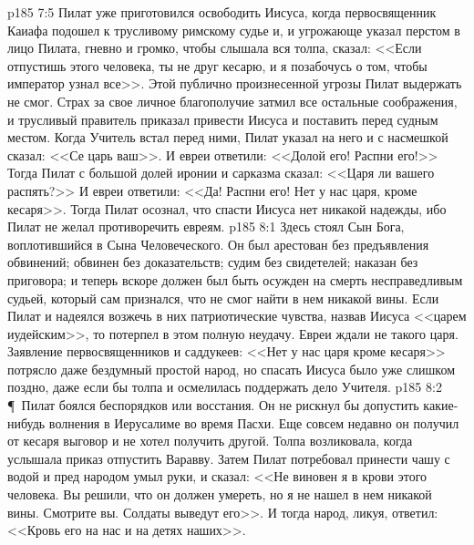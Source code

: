 \vs p185 7:5 Пилат уже приготовился освободить Иисуса, когда первосвященник Каиафа подошел к трусливому римскому судье и, и угрожающе указал перстом в лицо Пилата, гневно и громко, чтобы слышала вся толпа, сказал: <<Если отпустишь этого человека, ты не друг кесарю, и я позабочусь о том, чтобы император узнал все>>. Этой публично произнесенной угрозы Пилат выдержать не смог. Страх за свое личное благополучие затмил все остальные соображения, и трусливый правитель приказал привести Иисуса и поставить перед судным местом. Когда Учитель встал перед ними, Пилат указал на него и с насмешкой сказал: <<Се царь ваш>>. И евреи ответили: <<Долой его! Распни его!>> Тогда Пилат с большой долей иронии и сарказма сказал: <<Царя ли вашего распять?>> И евреи ответили: <<Да! Распни его! Нет у нас царя, кроме кесаря>>. Тогда Пилат осознал, что спасти Иисуса нет никакой надежды, ибо Пилат не желал противоречить евреям.
\vs p185 8:1 Здесь стоял Сын Бога, воплотившийся в Сына Человеческого. Он был арестован без предъявления обвинений; обвинен без доказательств; судим без свидетелей; наказан без приговора; и теперь вскоре должен был быть осужден на смерть несправедливым судьей, который сам признался, что не смог найти в нем никакой вины. Если Пилат и надеялся возжечь в них патриотические чувства, назвав Иисуса <<царем иудейским>>, то потерпел в этом полную неудачу. Евреи ждали не такого царя. Заявление первосвященников и саддукеев: <<Нет у нас царя кроме кесаря>> потрясло даже бездумный простой народ, но спасать Иисуса было уже слишком поздно, даже если бы толпа и осмелилась поддержать дело Учителя.
\vs p185 8:2 \P\ Пилат боялся беспорядков или восстания. Он не рискнул бы допустить какие\hyp{}нибудь волнения в Иерусалиме во время Пасхи. Еще совсем недавно он получил от кесаря выговор и не хотел получить другой. Толпа возликовала, когда услышала приказ отпустить Варавву. Затем Пилат потребовал принести чашу с водой и пред народом умыл руки, и сказал: <<Не виновен я в крови этого человека. Вы решили, что он должен умереть, но я не нашел в нем никакой вины. Смотрите вы. Солдаты выведут его>>. И тогда народ, ликуя, ответил: <<Кровь его на нас и на детях наших>>.
